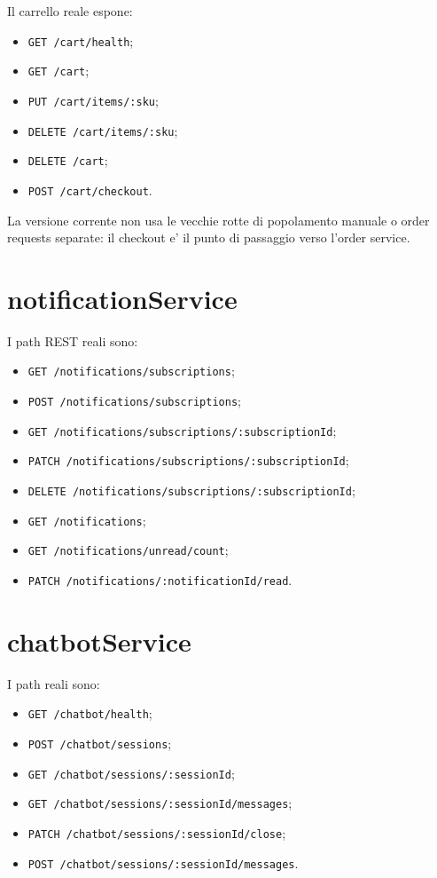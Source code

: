 Il carrello reale espone:

\begin{itemize}
\item \texttt{GET /cart/health};
\item \texttt{GET /cart};
\item \texttt{PUT /cart/items/:sku};
\item \texttt{DELETE /cart/items/:sku};
\item \texttt{DELETE /cart};
\item \texttt{POST /cart/checkout}.
\end{itemize}

La versione corrente non usa le vecchie rotte di popolamento manuale o order requests separate: il checkout e' il punto di passaggio verso l'order service.

\section{notificationService}

I path REST reali sono:

\begin{itemize}
\item \texttt{GET /notifications/subscriptions};
\item \texttt{POST /notifications/subscriptions};
\item \texttt{GET /notifications/subscriptions/:subscriptionId};
\item \texttt{PATCH /notifications/subscriptions/:subscriptionId};
\item \texttt{DELETE /notifications/subscriptions/:subscriptionId};
\item \texttt{GET /notifications};
\item \texttt{GET /notifications/unread/count};
\item \texttt{PATCH /notifications/:notificationId/read}.
\end{itemize}

\section{chatbotService}

I path reali sono:

\begin{itemize}
\item \texttt{GET /chatbot/health};
\item \texttt{POST /chatbot/sessions};
\item \texttt{GET /chatbot/sessions/:sessionId};
\item \texttt{GET /chatbot/sessions/:sessionId/messages};
\item \texttt{PATCH /chatbot/sessions/:sessionId/close};
\item \texttt{POST /chatbot/sessions/:sessionId/messages}.
\end{itemize}


